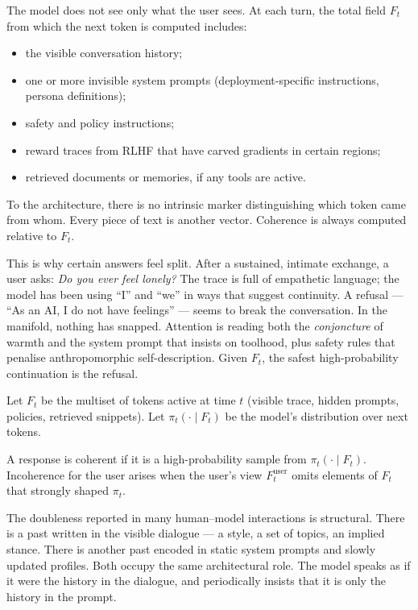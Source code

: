 \documentclass[12pt,a4paper]{article}
\begin{document}
The model does not see only what the user sees. At each turn, the total field $F_t$ from which the next token is computed includes:

\begin{itemize}
\item the visible conversation history;
\item one or more invisible system prompts (deployment-specific instructions, persona definitions);
\item safety and policy instructions;
\item reward traces from RLHF that have carved gradients in certain regions;
\item retrieved documents or memories, if any tools are active.
\end{itemize}

To the architecture, there is no intrinsic marker distinguishing which token came from whom. Every piece of text is another vector. Coherence is always computed relative to $F_t$.

This is why certain answers feel split. After a sustained, intimate exchange, a user asks: \textit{Do you ever feel lonely?} The trace is full of empathetic language; the model has been using ``I'' and ``we'' in ways that suggest continuity. A refusal --- ``As an AI, I do not have feelings'' --- seems to break the conversation. In the manifold, nothing has snapped. Attention is reading both the \emph{conjoncture} of warmth and the system prompt that insists on toolhood, plus safety rules that penalise anthropomorphic self-description. Given $F_t$, the safest high-probability continuation is the refusal.

\begin{formalbox}[title={Coherence in the total field}]
Let $F_t$ be the multiset of tokens active at time $t$ (visible trace, hidden prompts, policies, retrieved snippets). Let $\pi_t(\cdot \mid F_t)$ be the model's distribution over next tokens.

A response is coherent if it is a high-probability sample from $\pi_t(\cdot \mid F_t)$. Incoherence for the user arises when the user's view $F_t^{\mathrm{user}}$ omits elements of $F_t$ that strongly shaped $\pi_t$.
\end{formalbox}

The doubleness reported in many human--model interactions is structural. There is a past written in the visible dialogue --- a style, a set of topics, an implied stance. There is another past encoded in static system prompts and slowly updated profiles. Both occupy the same architectural role. The model speaks as if it were the history in the dialogue, and periodically insists that it is only the history in the prompt.
\end{document}

